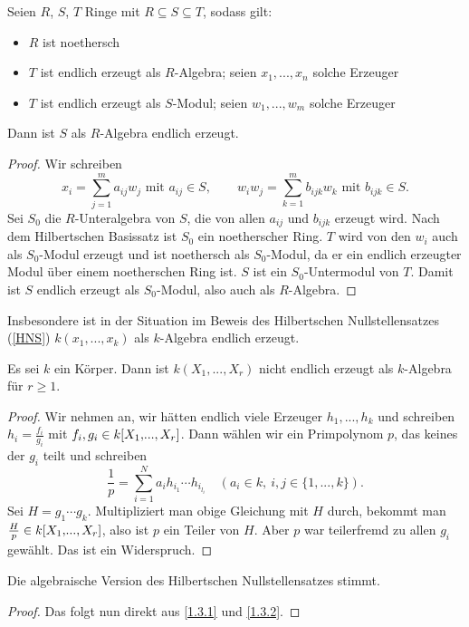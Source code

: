 \documentclass[a4paper,12pt]{scrbook}
\newtheorem{proof}{Beweis}
\renewcommand{\dotsc}{\ensuremath{\!...}}
\newcommand{\polyx}[1][n]{\ensuremath%
  [X_{1},\dotsc,X_{#1}]}
\begin{document}
\begin{lem}\label{1.3.1}
  Seien $R$, $S$, $T$ Ringe mit $R\subseteq S\subseteq T$, sodass gilt:
  \begin{itemize}
  \item $R$ ist noethersch
  \item $T$ ist endlich erzeugt als $R$-Algebra; seien $x_1,\dotsc,x_n$ solche Erzeuger
  \item $T$ ist endlich erzeugt als $S$-Modul; seien $w_1,\dotsc,w_m$ solche Erzeuger
  \end{itemize}
  Dann ist $S$ als $R$-Algebra endlich erzeugt.
\end{lem}
\begin{proof}
  Wir schreiben 
  \[ x_i=\displaystyle\sum_{j=1}^m a_{ij}w_j \text{ mit } a_{ij}\in S, \qquad
     w_iw_j=\displaystyle\sum_{k=1}^m b_{ijk}w_k \text { mit } b_{ijk}\in S. \]
  Sei $S_0$ die $R$-Unteralgebra von $S$, die von allen $a_{ij}$ und $b_{ijk}$ erzeugt wird. Nach dem Hilbertschen Basissatz ist
  $S_0$ ein noetherscher Ring. $T$ wird von den $w_i$ auch als $S_0$-Modul erzeugt und ist noethersch als $S_0$-Modul, da er ein
  endlich erzeugter Modul über einem noetherschen Ring ist. $S$ ist ein $S_0$-Untermodul von $T$. Damit ist $S$ endlich erzeugt
  als $S_0$-Modul, also auch als $R$-Algebra.
\end{proof}

Insbesondere ist in der Situation im Beweis des Hilbertschen Nullstellensatzes (\cref{HNS}) $k(x_1,\dotsc,x_k)$ als
$k$-Algebra endlich erzeugt.

\begin{lem}\label{1.3.2}
  Es sei $k$ ein Körper. Dann ist $k(X_1,\dotsc,X_r)$ nicht endlich erzeugt als $k$-Algebra für $r\ge1$.
\end{lem}
\begin{proof}
  Wir nehmen an, wir hätten endlich viele Erzeuger $h_1,\dotsc,h_k$ und schreiben $h_i=\frac{f_i}{g_i}$ mit $f_i,g_i\in
  k\polyx[r]$. Dann wählen wir ein Primpolynom $p$, das keines der $g_i$ teilt und schreiben
  \[ \frac1p = \sum_{i=1}^N a_i h_{i_1}\dotsm h_{i_{l_i}} \quad (a_i\in k,\ i,j\in\{1,\dotsc,k\}). \]
  Sei $H=g_1\dotsm g_k$. Multipliziert man obige Gleichung mit $H$ durch, bekommt man $\frac{H}{p}\in k\polyx[r]$, also
  ist $p$ ein Teiler von $H$. Aber $p$ war teilerfremd zu allen $g_i$ gewählt. Das ist ein Widerspruch.
\end{proof}

\begin{prop}\label{1.3.3}
  Die algebraische Version des Hilbertschen Nullstellensatzes stimmt.
\end{prop}
\begin{proof}
  Das folgt nun direkt aus \cref{1.3.1} und \cref{1.3.2}.
\end{proof}
\end{document}
